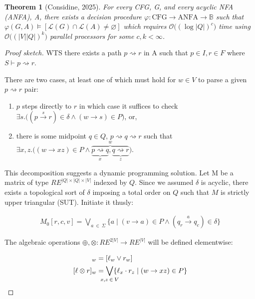 \documentclass[11pt]{article}
\theoremstyle{plain}
\newtheorem{theorem}{Theorem}
\theoremstyle{definition}
\begin{document}
\begin{theorem}[Considine, 2025]
  For every CFG, G, and every acyclic NFA (ANFA), A, there exists a decision procedure $\varphi: \text{CFG} \rightarrow \text{ANFA} \rightarrow \mathbb{B}$ such that $\varphi(G, A) \models [\mathcal{L}(G)\cap\mathcal{L}(A) \neq \varnothing]$ which requires $\mathcal{O}\big((\log |Q|)^c\big)$ time using $\mathcal{O}\big((|V||Q|)^k\big)$ parallel processors for some $c, k < \infty$.
\end{theorem}

\begin{proof}[Proof sketch]
  WTS there exists a path $p \rightsquigarrow r$ in A such that $p\in I, r\in F$ where $S \vdash p \rightsquigarrow r$.\vspace{0.3cm}

  \noindent There are two cases, at least one of which must hold for $w \in V$ to parse a given $p \rightsquigarrow r$ pair:

  \begin{enumerate}
    \item $p$ steps directly to $r$ in which case it suffices to check $\exists s.\big((p \overset{s}{\rightarrow} r)\in \delta \land (w \rightarrow s) \in P\big)$, or,
    \item there is some midpoint $q \in Q$, $p \rightsquigarrow q \rightsquigarrow r$ such that $\exists x, z.\big((w \rightarrow xz) \in P\land\overbrace{\underbrace{p \rightsquigarrow q}_x, \underbrace{q \rightsquigarrow r}_z}^w\big)$.
  \end{enumerate}

\noindent This decomposition suggests a dynamic programming solution. Let M be a matrix of type $RE^{|Q|\times|Q|\times|V|}$  indexed by $Q$. Since we assumed $\delta$ is acyclic, there exists a topological sort of $\delta$ imposing a total order on $Q$ such that $M$ is strictly upper triangular (SUT). Initiate it thusly:

\begin{align}
    M_0[r, c, v] = \bigvee_{a\:\in\:\Sigma} \{a \mid (v \rightarrow a) \in P \land (q_r \overset{a}{\rightarrow} q_c)\in \delta\}
\end{align}

\noindent The algebraic operations $\oplus, \otimes: RE^{2|V|} \rightarrow RE^{|V|}$ will be defined elementwise:

\begin{align}
  [\ell \oplus r]_w  &= [\ell_w \lor r_w]\\
  [\ell \otimes r]_w &= \bigvee_{\mathclap{x, z\:\in\:V}}\{\ell_x \cdot r_z \mid (w \rightarrow xz) \in P\}
\end{align}


\end{proof}
\end{document}
